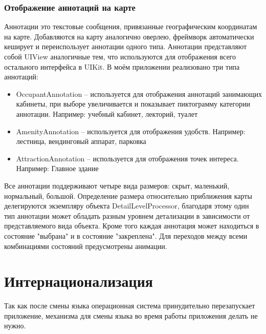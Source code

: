     \subsubsection{Отображение аннотаций на карте}
      Аннотации это текстовые сообщения, привязанные географическим координатам на карте. Добавляются на карту аналогично оверлею, фреймворк автоматически кеширует и переиспользует аннотации одного типа. Аннотации представляют собой UIView аналогичные тем, что используются для отображения всего остального интерфейса в UIKit.
      В моём приложении реализовано три типа аннотаций:
      \begin{itemize}
        \item OccupantAnnotation -- используется для отображения аннотаций занимающих кабинеты, при выборе увеличивается и показывает пиктограмму категории аннотации. Например: учебный кабинет, лекторий, туалет
        \item AmenityAnnotation -- используется для отображения удобств. Например: лестница, вендинговый аппарат, парковка
        \item AttractionAnnotation -- используется для отображения точек интереса. Например: Главное здание
      \end{itemize}


      Все аннотации поддерживают четыре вида размеров: скрыт, маленький, нормальный, большой. Определение размера относительно приближения карты делегируются экземпляру объекта DetailLevelProcessor, благодаря этому один тип аннотации может обладать разным уровнем детализации в зависимости от представляемого вида объекта. Кроме того каждая аннотация может находиться в состояние "выбрана" и в состояние "закреплена". Для переходов между всеми комбинациями состояний предусмотрены анимации.


  \section{Интернационализация}
    Так как после смены языка операционная система принудительно перезапускает приложение, механизма для смены языка во время работы приложения делать не нужно.


